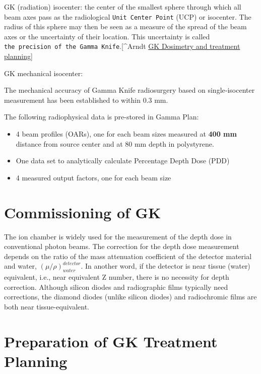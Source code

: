 \documentclass[]{book}
\providecommand{\tightlist}{%
  \setlength{\itemsep}{0pt}\setlength{\parskip}{0pt}}
\theoremstyle{definition}
\theoremstyle{definition}
\theoremstyle{definition}
\theoremstyle{remark}
\begin{document}
GK (radiation) isocenter: the center of the smallest sphere through
which all beam axes pass as the radiological
\texttt{Unit\ Center\ Point} (UCP) or isocenter. The radius of this
sphere may then be seen as a measure of the spread of the beam axes or
the uncertainty of their location. This uncertainty is called
\texttt{the\ precision\ of\ the\ Gamma\ Knife}.{[}\^{}Arndt
\href{https://www.aapm.org/meetings/99AM/pdf/2756-33420.pdf}{GK
Dosimetry and treatment planning}{]}

GK mechanical isocenter:

The mechanical accuracy of Gamma Knife radiosurgery based on
single‐isocenter measurement has been established to within 0.3 mm.

The following radiophysical data is pre-stored in Gamma Plan:

\begin{itemize}
\tightlist
\item
  4 beam profiles (OARs), one for each beam sizes measured at
  \textbf{400 mm} distance from source center and at 80 mm depth in
  polystyrene.
\item
  One data set to analytically calculate Percentage Depth Dose (PDD)
\item
  4 measured output factors, one for each beam size
\end{itemize}

\section{Commissioning of GK}\label{commissioning-of-gk}

The ion chamber is widely used for the measurement of the depth dose in
conventional photon beams. The correction for the depth dose measurement
depends on the ratio of the mass attenuation coefficient of the detector
material and water, \(\left( \mu/\rho \right )^{detector}_{water}\). In
another word, if the detector is near tissue (water) equivalent, i.e.,
near equivalent Z number, there is no necessity for depth correction.
Although silicon diodes and radiographic films typically need
corrections, the diamond diodes (unlike silicon diodes) and radiochromic
films are both near tissue-equivalent.

\section{Preparation of GK Treatment
Planning}\label{preparation-of-gk-treatment-planning}
\end{document}
